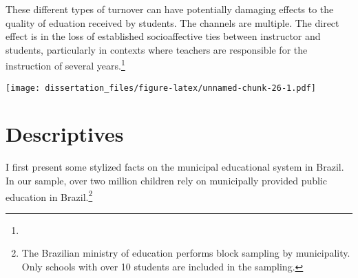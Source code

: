 \documentclass[12pt,]{book}
\newenvironment{Shaded}{\begin{snugshade}}{\end{snugshade}}
\newcommand{\DataTypeTok}[1]{\textcolor[rgb]{0.13,0.29,0.53}{#1}}
\newcommand{\DecValTok}[1]{\textcolor[rgb]{0.00,0.00,0.81}{#1}}
\newcommand{\KeywordTok}[1]{\textcolor[rgb]{0.13,0.29,0.53}{\textbf{#1}}}
\newcommand{\NormalTok}[1]{#1}
\newcommand{\OperatorTok}[1]{\textcolor[rgb]{0.81,0.36,0.00}{\textbf{#1}}}
\newcommand{\StringTok}[1]{\textcolor[rgb]{0.31,0.60,0.02}{#1}}
\let\rmarkdownfootnote\footnote%
\def\footnote{\protect\rmarkdownfootnote}
\begin{document}
These different types of turnover can have potentially damaging effects to the quality of eduation received by students. The channels are multiple. The direct effect is in the loss of established socioaffective ties between instructor and students, particularly in contexts where teachers are responsible for the instruction of several years.\footnote{}

\begin{Shaded}
\end{Shaded}

\texttt{[image: dissertation\_files/figure-latex/unnamed-chunk-26-1.pdf]}

\hypertarget{descriptives}{%
\section{Descriptives}\label{descriptives}}

I first present some stylized facts on the municipal educational system in Brazil. In our sample, over two million children rely on municipally provided public education in Brazil.\footnote{The Brazilian ministry of education performs block sampling by municipality. Only schools with over 10 students are included in the sampling.}
\end{document}
